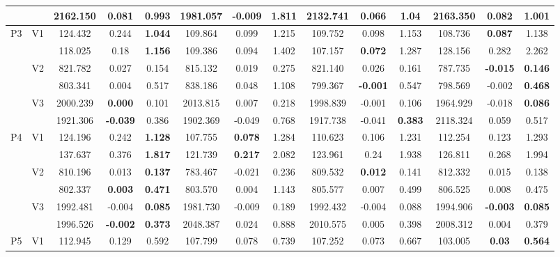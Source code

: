 \documentclass[12pt,a4paper]{article}
\begin{document}
\begin{sidewaystable}[ht]
{\begin{tabular}{cc|ccc|ccc|ccc|ccc|}
   &  & 2162.150 & 0.081 & \textbf{0.993} & 1981.057 & \textbf{-0.009} & 1.811 & 2132.741 & 0.066 & 1.04 & 2163.350 & 0.082 & 1.001 \\ 
   \hline \hline\multirow{6}{*}{P3} & \multirow{2}{*}{V1} & 124.432 & 0.244 & \textbf{1.044} & 109.864 & 0.099 & 1.215 & 109.752 & 0.098 & 1.153 & 108.736 & \textbf{0.087} & 1.138 \\ 
   &  & 118.025 & 0.18 & \textbf{1.156} & 109.386 & 0.094 & 1.402 & 107.157 & \textbf{0.072} & 1.287 & 128.156 & 0.282 & 2.262 \\ 
   & \multirow{2}{*}{V2} & 821.782 & 0.027 & 0.154 & 815.132 & 0.019 & 0.275 & 821.140 & 0.026 & 0.161 & 787.735 & \textbf{-0.015} & \textbf{0.146} \\ 
   &  & 803.341 & 0.004 & 0.517 & 838.186 & 0.048 & 1.108 & 799.367 & \textbf{-0.001} & 0.547 & 798.569 & -0.002 & \textbf{0.468} \\ 
   & \multirow{2}{*}{V3} & 2000.239 & \textbf{0.000} & 0.101 & 2013.815 & 0.007 & 0.218 & 1998.839 & -0.001 & 0.106 & 1964.929 & -0.018 & \textbf{0.086} \\ 
   &  & 1921.306 & \textbf{-0.039} & 0.386 & 1902.369 & -0.049 & 0.768 & 1917.738 & -0.041 & \textbf{0.383} & 2118.324 & 0.059 & 0.517 \\ 
   \hline \hline\multirow{6}{*}{P4} & \multirow{2}{*}{V1} & 124.196 & 0.242 & \textbf{1.128} & 107.755 & \textbf{0.078} & 1.284 & 110.623 & 0.106 & 1.231 & 112.254 & 0.123 & 1.293 \\ 
   &  & 137.637 & 0.376 & \textbf{1.817} & 121.739 & \textbf{0.217} & 2.082 & 123.961 & 0.24 & 1.938 & 126.811 & 0.268 & 1.994 \\ 
   & \multirow{2}{*}{V2} & 810.196 & 0.013 & \textbf{0.137} & 783.467 & -0.021 & 0.236 & 809.532 & \textbf{0.012} & 0.141 & 812.332 & 0.015 & 0.138 \\ 
   &  & 802.337 & \textbf{0.003} & \textbf{0.471} & 803.570 & 0.004 & 1.143 & 805.577 & 0.007 & 0.499 & 806.525 & 0.008 & 0.475 \\ 
   & \multirow{2}{*}{V3} & 1992.481 & -0.004 & \textbf{0.085} & 1981.730 & -0.009 & 0.189 & 1992.432 & -0.004 & 0.088 & 1994.906 & \textbf{-0.003} & \textbf{0.085} \\ 
   &  & 1996.526 & \textbf{-0.002} & \textbf{0.373} & 2048.387 & 0.024 & 0.888 & 2010.575 & 0.005 & 0.398 & 2008.312 & 0.004 & 0.379 \\ 
   \hline \hline\multirow{6}{*}{P5} & \multirow{2}{*}{V1} & 112.945 & 0.129 & 0.592 & 107.799 & 0.078 & 0.739 & 107.252 & 0.073 & 0.667 & 103.005 & \textbf{0.03} & \textbf{0.564} \\ 

\end{tabular}}
\end{sidewaystable}
\end{document}
